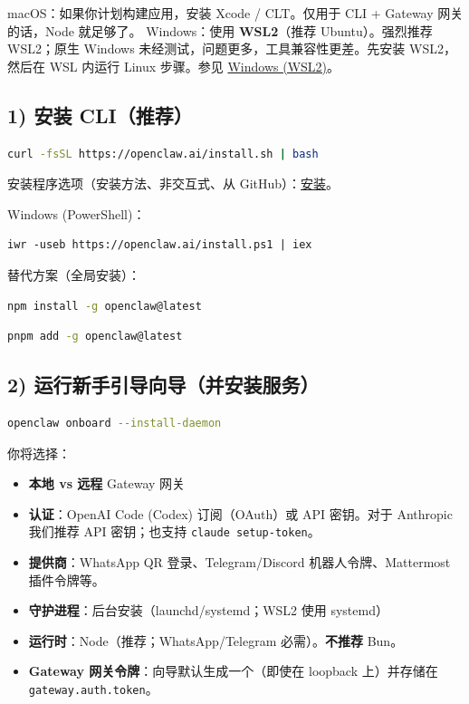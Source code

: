 macOS：如果你计划构建应用，安装 Xcode / CLT。仅用于 CLI + Gateway 网关的话，Node 就足够了。
Windows：使用 \textbf{WSL2}（推荐 Ubuntu）。强烈推荐 WSL2；原生 Windows 未经测试，问题更多，工具兼容性更差。先安装 WSL2，然后在 WSL 内运行 Linux 步骤。参见 \href{/platforms/windows}{Windows (WSL2)}。

\subsection{1) 安装 CLI（推荐）}


\begin{lstlisting}[language=bash]
curl -fsSL https://openclaw.ai/install.sh | bash
\end{lstlisting}


安装程序选项（安装方法、非交互式、从 GitHub）：\href{/install}{安装}。

Windows (PowerShell)：

\begin{lstlisting}
iwr -useb https://openclaw.ai/install.ps1 | iex
\end{lstlisting}


替代方案（全局安装）：

\begin{lstlisting}[language=bash]
npm install -g openclaw@latest
\end{lstlisting}


\begin{lstlisting}[language=bash]
pnpm add -g openclaw@latest
\end{lstlisting}


\subsection{2) 运行新手引导向导（并安装服务）}


\begin{lstlisting}[language=bash]
openclaw onboard --install-daemon
\end{lstlisting}


你将选择：

\begin{itemize}
  \item \textbf{本地 vs 远程} Gateway 网关
  \item \textbf{认证}：OpenAI Code (Codex) 订阅（OAuth）或 API 密钥。对于 Anthropic 我们推荐 API 密钥；也支持 \texttt{claude setup-token}。
  \item \textbf{提供商}：WhatsApp QR 登录、Telegram/Discord 机器人令牌、Mattermost 插件令牌等。
  \item \textbf{守护进程}：后台安装（launchd/systemd；WSL2 使用 systemd）
  \item \textbf{运行时}：Node（推荐；WhatsApp/Telegram 必需）。\textbf{不推荐} Bun。
  \item \textbf{Gateway 网关令牌}：向导默认生成一个（即使在 loopback 上）并存储在 \texttt{gateway.auth.token}。
\end{itemize}


